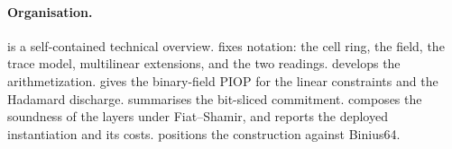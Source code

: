 \paragraph{Organisation.}  is a self-contained technical
overview.  fixes notation: the cell ring, the field, the trace
model, multilinear extensions, and the two readings.  develops
the arithmetization.  gives the binary-field PIOP for the linear
constraints and  the Hadamard discharge. 
summarises the bit-sliced commitment.  composes the
soundness of the layers under Fiat--Shamir, and  reports the
deployed instantiation and its costs.  positions the construction
against Binius64.
